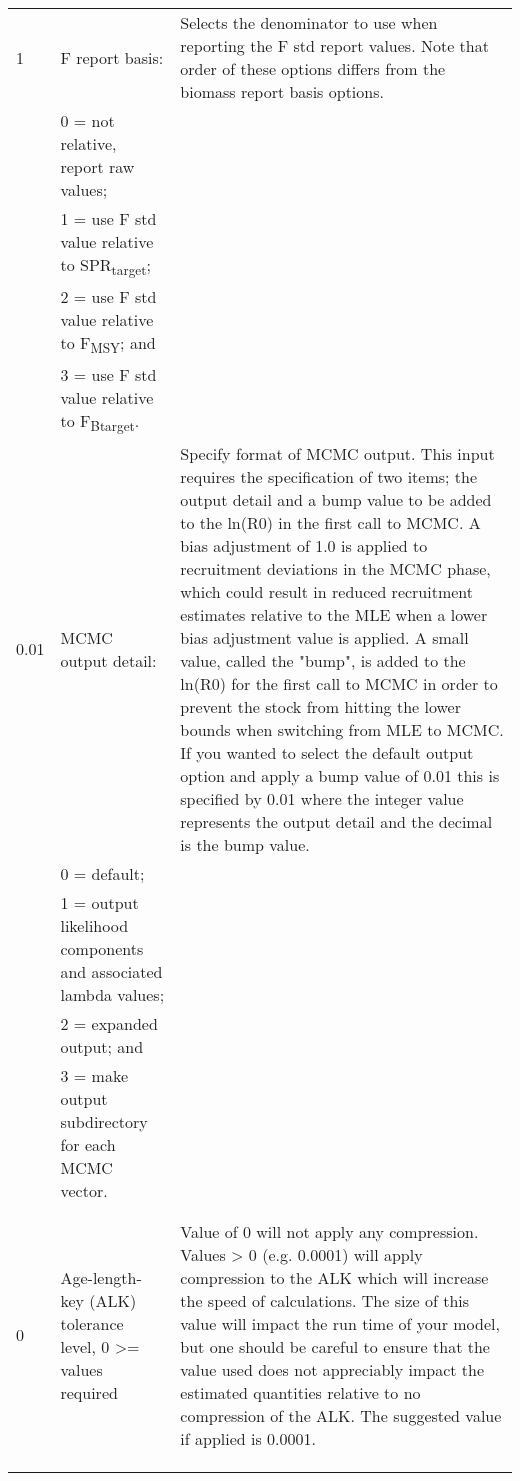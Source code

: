 {\begin{landscape}
\begin{longtable}{p{1.5cm} p{7.2cm} p{12.3cm}}
 \hline
 1 & F report basis: &  \multirow{1}{1cm}[-0.25cm]{\parbox{12.5cm}{Selects the denominator to use when reporting the F std report values.  Note that order of these options differs from the biomass report basis options.}}\Tstrut\\
   & 0 = not relative, report raw values; & \\
   & 1 = use F std value relative to SPR\textsubscript{target}; & \\
   & 2 = use F std value relative to F\textsubscript{MSY}; and & \\
 
  \pagebreak
   & 3 = use F std value relative to F\textsubscript{Btarget}. & \Tstrut\\

  \hline
  0.01 & MCMC output detail: & \multirow{1}{1cm}[-0.25cm]{\parbox{12.5cm}{Specify format of MCMC output. This input requires the specification of two items; the output detail and a bump value to be added to the ln(R0) in the first call to MCMC. A bias adjustment of 1.0 is applied to recruitment deviations in the MCMC phase, which could result in reduced recruitment estimates relative to the MLE when a lower bias adjustment value is applied.  A small value, called the "bump", is added to the ln(R0) for the first call to MCMC in order to prevent the stock from hitting the lower bounds when switching from MLE to MCMC. If you wanted to select the default output option and apply a bump value of 0.01 this is specified by 0.01 where the integer value represents the output detail and the decimal is the bump value.}} \Tstrut\\
  & 0 = default; & \\
  & 1 = output likelihood components and associated lambda values; &  \\
  & 2 = expanded output; and &  \\		 
  & 3 = make output subdirectory for each MCMC vector. &  \\
  & & \\
  & & \\  		 
  
  \hline
  \hypertarget{ALK}{0} & Age-length-key (ALK) tolerance level, 0 >= values required & \multirow{1}{1cm}[-0.25cm]{\parbox{12.5cm}{Value of 0 will not apply any compression.  Values > 0 (e.g. 0.0001) will apply compression to the ALK which will increase the speed of calculations.  The size of this value will impact the run time of your model, but one should be careful to ensure that the value used does not appreciably impact the estimated quantities relative to no compression of the ALK.  The suggested value if applied is 0.0001.}} \Tstrut\\ 
  & & \\
  & & \\
  & & \Bstrut\\
  

\end{longtable}
\end{landscape}}
